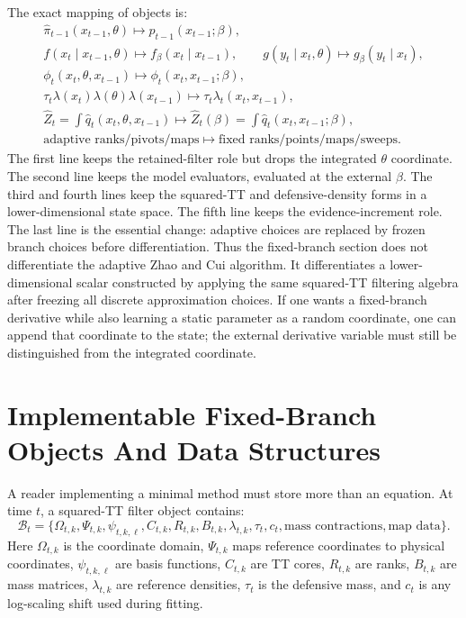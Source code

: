 \documentclass[11pt]{article}
\begin{document}
The exact mapping of objects is:
\[
\begin{gathered}
\widehat\pi_{t-1}(x_{t-1},\theta)
\mapsto
\widehat p_{t-1}(x_{t-1};\beta),\\
f(x_t\mid x_{t-1},\theta)\mapsto f_\beta(x_t\mid x_{t-1}),
\qquad
g(y_t\mid x_t,\theta)\mapsto g_\beta(y_t\mid x_t),\\
\phi_t(x_t,\theta,x_{t-1})
\mapsto
\phi_t(x_t,x_{t-1};\beta),\\
\tau_t\lambda(x_t)\lambda(\theta)\lambda(x_{t-1})
\mapsto
\tau_t\lambda_t(x_t,x_{t-1}),\\
\widehat Z_t
=
\int\widehat q_t(x_t,\theta,x_{t-1})
\mapsto
\widehat Z_t(\beta)
=
\int\widehat q_t(x_t,x_{t-1};\beta),\\
\text{adaptive ranks/pivots/maps}
\mapsto
\text{fixed ranks/points/maps/sweeps}.
\end{gathered}
\label{eq:p24-r3}
\]
The first line keeps the retained-filter role but drops the integrated
\(\theta\) coordinate.  The second line keeps the model evaluators, evaluated at
the external \(\beta\).  The third and fourth lines keep the squared-TT and
defensive-density forms in a lower-dimensional state space.  The fifth line
keeps the evidence-increment role.  The last line is the essential change:
adaptive choices are replaced by frozen branch choices before differentiation.
Thus the fixed-branch section does not differentiate the adaptive Zhao and Cui \cite{zhao2024ttsequential}
algorithm.  It differentiates a lower-dimensional scalar constructed by applying
the same squared-TT filtering algebra after freezing all discrete approximation
choices.  If one wants a fixed-branch derivative while also learning a static
parameter as a random coordinate, one can append that coordinate to the state;
the external derivative variable must still be distinguished from the
integrated coordinate.

\section{Implementable Fixed-Branch Objects And Data Structures}

A reader implementing a minimal method must store more than an equation.  At
time \(t\), a squared-TT filter object contains:
\[
    \mathcal B_t
    =
    \{
    \Omega_{t,k},\Psi_{t,k},\psi_{t,k,\ell},C_{t,k},
    R_{t,k},B_{t,k},\lambda_{t,k},\tau_t,c_t,
    \text{mass contractions},\text{map data}
    \}.
\]
Here \(\Omega_{t,k}\) is the coordinate domain, \(\Psi_{t,k}\) maps reference
coordinates to physical coordinates, \(\psi_{t,k,\ell}\) are basis functions,
\(C_{t,k}\) are TT cores, \(R_{t,k}\) are ranks, \(B_{t,k}\) are mass matrices,
\(\lambda_{t,k}\) are reference densities, \(\tau_t\) is the defensive mass, and
\(c_t\) is any log-scaling shift used during fitting.
\end{document}
